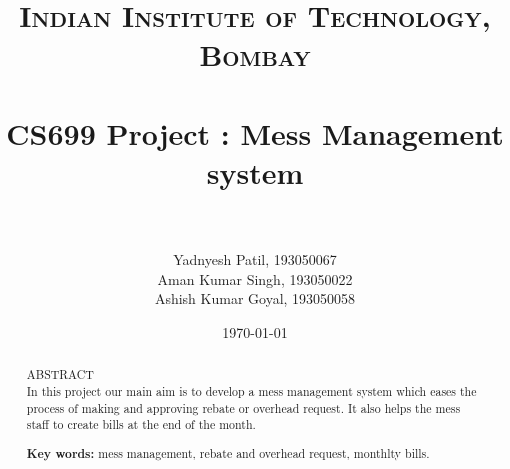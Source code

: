 \documentclass[paper=a4, fontsize=16pt]{scrartcl} %
\title{	
\normalfont \normalsize 
\textsc{Indian Institute of Technology, Bombay} \\ [50pt] %
\horrule{0.5pt} \\[0.4cm] %
\huge CS699 Project : Mess Management system\\ %
\horrule{2pt} \\[0.5cm] %
}
\author{  Yadnyesh Patil, 193050067\\
Aman Kumar Singh, 193050022 \\ Ashish Kumar Goyal, 193050058} %
\date{\normalsize\today} %
\numberwithin{equation}{section} %
\numberwithin{figure}{section} %
\numberwithin{table}{section} %
\begin{document}
\clearpage\maketitle
\thispagestyle{empty}
\newpage
\begin{centering}


\begin{abstract}
\thispagestyle{empty}
{\hspace{5.5cm}\Large ABSTRACT}\\
\bigbreak
In this project our main aim is to develop a mess management system which eases the process of making and approving rebate or overhead request. It also helps the mess staff to create bills at the end of the month.   \\

  
  
\bigbreak

\textbf{Key words:} mess management, rebate and overhead request, monthlty bills.
    
\end{abstract}

\end{centering}
\vspace{\fill}

\newpage
\tableofcontents













\end{document}

